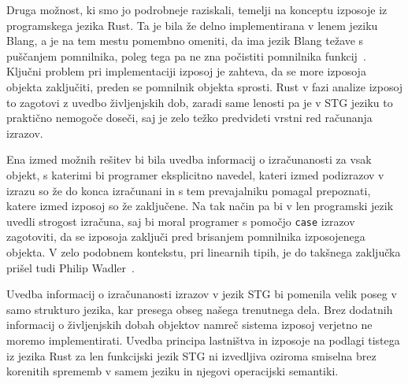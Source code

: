Druga možnost, ki smo jo podrobneje raziskali, temelji na konceptu izposoje iz programskega jezika Rust. Ta je bila že delno implementirana v lenem jeziku Blang, a je na tem mestu pomembno omeniti, da ima jezik Blang težave s puščanjem pomnilnika, poleg tega pa ne zna počistiti pomnilnika funkcij~\cite{turk2022len}. Ključni problem pri implementaciji izposoj je zahteva, da se more izposoja objekta zaključiti, preden se pomnilnik objekta sprosti. Rust v fazi analize izposoj to zagotovi z uvedbo življenjskih dob, zaradi same lenosti pa je v STG jeziku to praktično nemogoče doseči, saj je zelo težko predvideti vrstni red računanja izrazov.


Ena izmed možnih rešitev bi bila uvedba informacij o izračunanosti za vsak objekt, s katerimi bi programer eksplicitno navedel, kateri izmed podizrazov v izrazu so že do konca izračunani in s tem prevajalniku pomagal prepoznati, katere izmed izposoj so že zaključene. Na tak način pa bi v len programski jezik uvedli strogost izračuna, saj bi moral programer s pomočjo \texttt{case} izrazov zagotoviti, da se izposoja zaključi pred brisanjem pomnilnika izposojenega objekta. V zelo podobnem kontekstu, pri linearnih tipih, je do takšnega zaključka prišel tudi Philip Wadler~\cite{wadler1990linear}.

Uvedba informacij o izračunanosti izrazov v jezik STG bi pomenila velik poseg v samo strukturo jezika, kar presega obseg našega trenutnega dela. Brez dodatnih informacij o življenjskih dobah objektov namreč sistema izposoj verjetno ne moremo implementirati. Uvedba principa lastništva in izposoje na podlagi tistega iz jezika Rust za len funkcijski jezik STG ni izvedljiva oziroma smiselna brez korenitih sprememb v samem jeziku in njegovi operacijski semantiki.